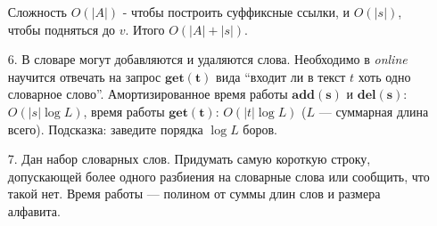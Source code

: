 \begin{enumerate}
	Сложность $O(|A|)$ - чтобы построить суффиксные ссылки, и $O(|s|)$, чтобы подняться до $v$. Итого $O(|A| + 
	|s|)$.
	
	\item[6.] В словаре могут добавляются и удаляются слова. Необходимо в \textit{online} научится отвечать на запрос 
	$\mathbf{get(t)}$ вида “входит ли в текст $t$ хоть одно словарное слово”. Амортизированное время работы 
	$\mathbf{add(s)}$ и $\mathbf{del(s)}$: $O(|s| \log L)$, время работы $\mathbf{get(t)}$: $O(|t| \log L)$ ($L$ — 
	суммарная длина всего). Подсказка: заведите порядка $\log L$ боров.
	
	\item[7.] Дан набор словарных слов. Придумать самую короткую строку, допускающей более одного разбиения на 
	словарные слова или сообщить, что такой нет. Время работы — полином от суммы длин слов и размера алфавита.
\end{enumerate}
